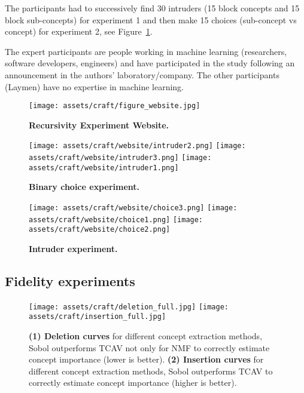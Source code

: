 The participants had to successively find 30 intruders (15 block concepts and 15 block sub-concepts) for experiment 1 and then make 15 choices (sub-concept vs concept) for experiment 2, see Figure~\ref{fig:craft:website}.

The expert participants are people working in machine learning (researchers, software developers, engineers) and have participated in the study following an announcement in the authors' laboratory/company. The other participants (Laymen) have no expertise in machine learning.

\begin{figure*}[ht]
    \centering
    \begin{subfigure}{0.95\textwidth}
        \texttt{[image: assets/craft/figure\_website.jpg]}
        \caption{\textbf{Recursivity Experiment Website.}}
        \label{fig:craft:website}
      
    \end{subfigure}
    \begin{subfigure}{0.95\textwidth}
        \centering
        \texttt{[image: assets/craft/website/intruder2.png]}
        \texttt{[image: assets/craft/website/intruder3.png]}
        \texttt{[image: assets/craft/website/intruder1.png]}
        \caption{\textbf{Binary choice experiment.}}
        \label{fig:craft:website_intruder}
    \end{subfigure}
    
    \begin{subfigure}{0.95\textwidth}
        \centering
        \texttt{[image: assets/craft/website/choice3.png]}
        \texttt{[image: assets/craft/website/choice1.png]}
        \texttt{[image: assets/craft/website/choice2.png]}
        \caption{\textbf{Intruder experiment.}}
        \label{fig:craft:website_choice}
    \end{subfigure}
\end{figure*}

\clearpage

\subsection{Fidelity experiments}\label{app:craft:fidelity}

\begin{figure}[ht]
  \texttt{[image: assets/craft/deletion\_full.jpg]}
  \texttt{[image: assets/craft/insertion\_full.jpg]}
  \caption{ \textbf{(1) Deletion curves} for different concept extraction methods, Sobol outperforms TCAV not only for NMF to correctly estimate concept importance (lower is better). \textbf{(2) Insertion curves} for different concept extraction methods, Sobol outperforms TCAV to correctly estimate concept importance (higher is better).}
  \label{fig:craft:deletion_full}
\end{figure}


